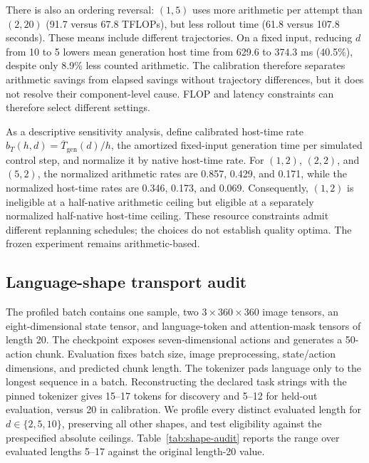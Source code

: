 \documentclass{article}
\begin{document}
There is also an ordering reversal: $(1,5)$ uses more arithmetic per attempt
than $(2,20)$ (91.7 versus 67.8 TFLOPs), but less rollout time (61.8 versus
107.8 seconds). These means include different trajectories. On a fixed input,
reducing $d$ from 10 to 5 lowers mean generation host time from 629.6 to
374.3 ms (40.5\%), despite only 8.9\% less counted arithmetic. The calibration
therefore separates arithmetic savings from elapsed savings without trajectory
differences, but it does not resolve their component-level cause. FLOP and
latency constraints can therefore select different settings.

As a descriptive sensitivity analysis, define calibrated host-time rate
$b_T(h,d)=\overline{T}_{\mathrm{gen}}(d)/h$, the amortized fixed-input generation
time per simulated control step, and normalize it by native host-time rate.
For $(1,2)$, $(2,2)$, and $(5,2)$, the normalized arithmetic rates are
0.857, 0.429, and 0.171, while the normalized host-time rates are 0.346, 0.173,
and 0.069. Consequently, $(1,2)$ is ineligible at a half-native arithmetic
ceiling but eligible at a separately normalized half-native host-time ceiling.
These resource constraints admit different replanning schedules; the choices do
not establish quality optima. The frozen experiment remains arithmetic-based.


\begin{table}[htbp]
\centering\small
\caption{Smallest execution prefix feasible for $d=2$ under separately
normalized arithmetic and fixed-input host-time ceilings. The resource
coordinate changes feasibility; these choices do not compare outcome quality.}
\label{tab:resource-coordinate-choices}

\end{table}

\subsection{Language-shape transport audit}
\label{app:shape-audit}

The profiled batch contains one sample, two $3\times360\times360$ image tensors,
an eight-dimensional state tensor, and language-token and attention-mask tensors
of length 20. The checkpoint exposes seven-dimensional actions and generates a
50-action chunk. Evaluation fixes batch size, image preprocessing, state/action
dimensions, and predicted chunk length. The tokenizer pads language only to the
longest sequence in a batch. Reconstructing the declared task strings with the pinned
tokenizer gives 15--17 tokens for discovery and 5--12 for held-out evaluation, versus 20
in calibration. We profile every distinct evaluated length for
$d\in\{2,5,10\}$, preserving all other shapes, and test eligibility against
the prespecified absolute ceilings. Table~\ref{tab:shape-audit} reports the range
over evaluated lengths 5--17 against the original length-20 value.
\end{document}
